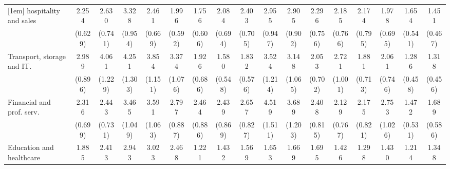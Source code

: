 {\begin{tabular}{l*{16}{c}}
[1em]
hospitality and sales&       2.254\sym{**} &       2.630\sym{***}&       3.328\sym{***}&       2.461\sym{***}&       1.996\sym{*}  &       1.756         &       2.084\sym{*}  &       2.403\sym{**} &       2.955\sym{***}&       2.905\sym{***}&       2.296\sym{*}  &       2.185\sym{*}  &       2.174\sym{*}  &       1.978         &       1.654         &       1.451         \\
                    &     (0.629)         &     (0.741)         &     (0.954)         &     (0.669)         &     (0.592)         &     (0.606)         &     (0.694)         &     (0.705)         &     (0.947)         &     (0.902)         &     (0.756)         &     (0.766)         &     (0.795)         &     (0.695)         &     (0.541)         &     (0.467)         \\
[1em]
Transport, storage and IT.&       2.989\sym{***}&       4.061\sym{***}&       4.251\sym{***}&       3.854\sym{***}&       3.374\sym{***}&       1.926         &       1.580         &       1.832         &       3.524\sym{***}&       3.148\sym{***}&       2.053\sym{*}  &       2.721\sym{**} &       1.881         &       2.061\sym{*}  &       1.286         &       1.318         \\
                    &     (0.896)         &     (1.229)         &     (1.303)         &     (1.151)         &     (1.076)         &     (0.686)         &     (0.548)         &     (0.576)         &     (1.214)         &     (1.065)         &     (0.702)         &     (1.001)         &     (0.713)         &     (0.746)         &     (0.458)         &     (0.456)         \\
[1em]
Financial and prof. serv.&       2.316\sym{**} &       2.443\sym{**} &       3.465\sym{***}&       3.591\sym{***}&       2.797\sym{**} &       2.464\sym{*}  &       2.439\sym{*}  &       2.657\sym{**} &       4.519\sym{***}&       3.689\sym{***}&       2.408\sym{**} &       2.129\sym{*}  &       2.175\sym{*}  &       2.753\sym{**} &       1.472         &       1.689         \\
                    &     (0.699)         &     (0.731)         &     (1.049)         &     (1.063)         &     (0.887)         &     (0.886)         &     (0.869)         &     (0.827)         &     (1.511)         &     (1.203)         &     (0.815)         &     (0.767)         &     (0.821)         &     (1.026)         &     (0.531)         &     (0.586)         \\
[1em]
Education and healthcare&       1.885         &       2.413\sym{**} &       2.943\sym{**} &       3.023\sym{**} &       2.468\sym{*}  &       1.221         &       1.432         &       1.569         &       1.653         &       1.669         &       1.695         &       1.426         &       1.298         &       1.430         &       1.214         &       1.348         \\

\end{tabular}}
